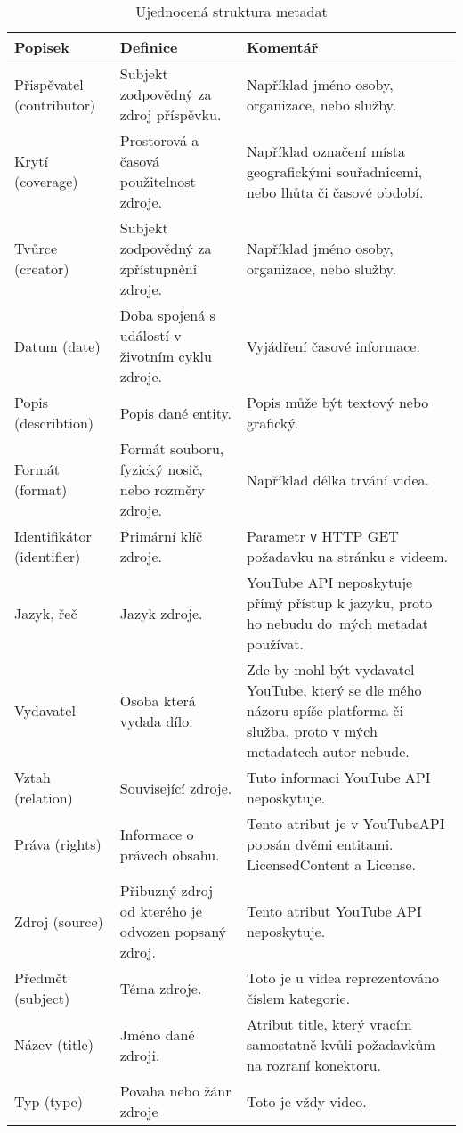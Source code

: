 \begin{table}[h!]
\begin{tabular}{|p{} | p{} | p{}|}
\hline
\textbf{Popisek} & \textbf{Definice} & \textbf{Komentář}\\
\hline
Přispěvatel (contributor) & Subjekt zodpovědný za zdroj příspěvku. & Například jméno osoby, organizace, nebo služby.\\
\hline
Krytí (coverage) & Prostorová a časová použitelnost zdroje. & Například označení místa geografickými souřadnicemi, nebo lhůta či časové období.\\
\hline
Tvůrce (creator) & Subjekt zodpovědný za zpřístupnění zdroje. & Například jméno osoby, organizace, nebo služby.\\
\hline
Datum (date) & Doba spojená s událostí v životním cyklu zdroje. & Vyjádření časové informace. \\
\hline
Popis (describtion) & Popis dané entity. & Popis může být textový nebo grafický. \\
\hline
Formát (format) & Formát souboru, fyzický nosič, nebo rozměry zdroje. & Například délka trvání videa. \\
\hline
Identifikátor (identifier) & Primární klíč zdroje. & Parametr \texttt{v} HTTP GET požadavku na stránku s videem.\\
\hline
Jazyk, řeč & Jazyk zdroje. & YouTube API neposkytuje přímý přístup k jazyku, proto ho nebudu do~mých metadat používat.\\
\hline
Vydavatel & Osoba která vydala dílo. & Zde by mohl být vydavatel YouTube, který se dle mého názoru spíše platforma či služba, proto v mých metadatech autor nebude.\\
\hline
Vztah (relation) & Související zdroje. & Tuto informaci YouTube API neposkytuje.\\
\hline
Práva (rights) & Informace o právech obsahu. & Tento atribut je v YouTubeAPI popsán dvěmi entitami. LicensedContent a License.\\
\hline
Zdroj (source) & Přibuzný zdroj od kterého je odvozen popsaný zdroj. & Tento atribut YouTube API neposkytuje.\\
\hline
Předmět (subject) & Téma zdroje. & Toto je u videa reprezentováno číslem kategorie.\\
\hline
Název (title) & Jméno dané zdroji. & Atribut title, který vracím samostatně kvůli požadavkům na rozraní konektoru.\\
\hline
Typ (type) & Povaha nebo žánr zdroje & Toto je vždy video.\\
\hline
\end{tabular}
\caption[DublinCore metadata]{Ujednocená struktura metadat}\label{tab:dublincore1}
\end{table}
\hfill